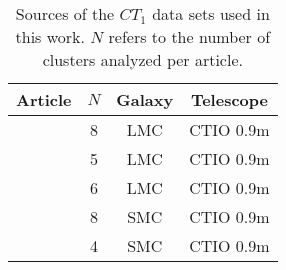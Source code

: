 \documentclass{aa}
\begin{document}
\begin{table} 
\centering
 \caption{Sources of the $CT_1$ data sets used in this work. $N$ refers to the
 number of clusters analyzed per article.}
\label{tab:literature}
 \begin{tabular}{l c c c}
\hline\hline
Article & $N$ & Galaxy & Telescope \\
\hline
\cite{Geisler_2003} & 8 & LMC & CTIO 0.9m \\ 
\cite{Piatti_2003a} & 5 & LMC & CTIO 0.9m \\ 
\cite{Piatti_2003b} & 6 & LMC & CTIO 0.9m \\ 
\cite{Piatti_2005} & 8 & SMC & CTIO 0.9m \\ 
\cite{Piatti_2007a} & 4 & SMC & CTIO 0.9m \\ 

\end{tabular}
\end{table}
\end{document}
